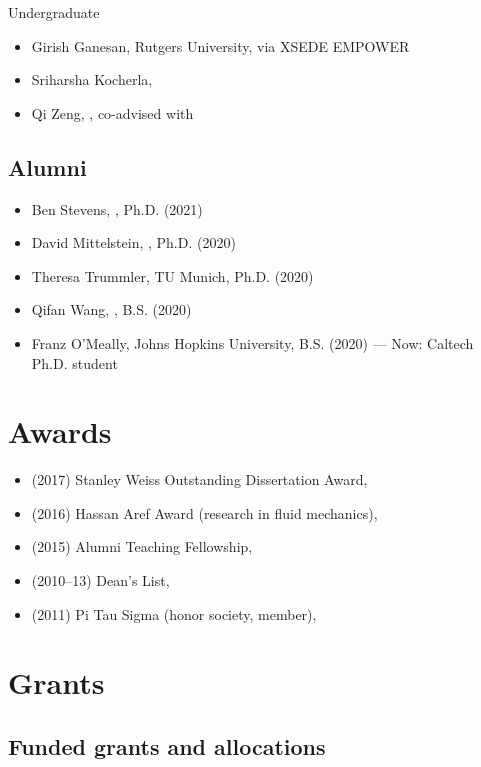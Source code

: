 Undergraduate
\begin{itemize}
    \item Girish Ganesan, Rutgers University, via XSEDE EMPOWER
    \item Sriharsha Kocherla, \GIT
    \item Qi Zeng, \GIT, co-advised with \Florian
\end{itemize}

\subsection{Alumni}

\begin{itemize}
    \item Ben Stevens, \CIT, Ph.D. (2021)
    \item David Mittelstein, \CIT, Ph.D. (2020)
    \item Theresa Trummler, TU Munich, Ph.D. (2020)
    \item Qifan Wang, \CIT, B.S. (2020)
    \item Franz O'Meally, Johns Hopkins University, B.S. (2020) --- Now: Caltech Ph.D. student
\end{itemize}

\section{Awards}

\begin{itemize}
    \item (2017) Stanley Weiss Outstanding Dissertation Award, \UIUC
    \item (2016) Hassan Aref Award (research in fluid mechanics), \UIUC
    \item (2015) Alumni Teaching Fellowship, \UIUC
    \item (2010--13) Dean's List, \UMD
    \item (2011) Pi Tau Sigma (honor society, member), \UMD
\end{itemize}

\section{Grants}

\subsection{Funded grants and allocations}

